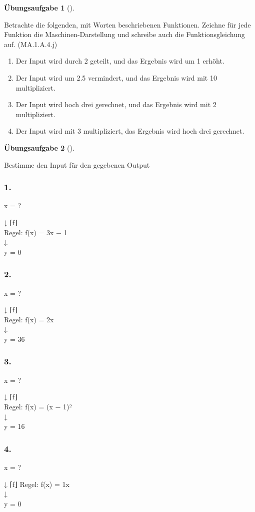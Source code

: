 \documentclass[
  10pt,
  a4paper,
  DIV=11]{scrartcl}
\providecommand{\tightlist}{%
  \setlength{\itemsep}{0pt}\setlength{\parskip}{0pt}}\usepackage{longtable,booktabs,array}
\theoremstyle{definition}
\newtheorem{exercise}{Übungsaufgabe}[section]
\theoremstyle{remark}
\begin{document}
\begin{exercise}[]\protect\hypertarget{exr-line}{}\label{exr-line}

Betrachte die folgenden, mit Worten beschriebenen Funktionen. Zeichne
für jede Funktion die Maschinen-Darstellung und schreibe auch die
Funktionsgleichung auf. (MA.1.A.4.j)

\begin{enumerate}
\def\labelenumi{\arabic{enumi}.}
\tightlist
\item
  Der Input wird durch 2 geteilt, und das Ergebnis wird um 1 erhöht.
\item
  Der Input wird um 2.5 vermindert, und das Ergebnis wird mit 10
  multipliziert.
\item
  Der Input wird hoch drei gerechnet, und das Ergebnis wird mit 2
  multipliziert.
\item
  Der Input wird mit 3 multipliziert, das Ergebnis wird hoch drei
  gerechnet.
\end{enumerate}

\end{exercise}

\begin{exercise}[]\protect\hypertarget{exr-line}{}\label{exr-line}

Bestimme den Input für den gegebenen Output

\subsubsection{1.}\label{section}

x = ?

↓ ⌈ƒ⌋\\
Regel: f(x) = 3x − 1\\
↓\\
y = 0

\subsubsection{2.}\label{section-1}

x = ?

↓ ⌈ƒ⌋\\
Regel: f(x) = 2x\\
↓\\
y = 36

\subsubsection{3.}\label{section-2}

x = ?

↓ ⌈ƒ⌋\\
Regel: f(x) = (x − 1)²\\
↓\\
y = 16

\subsubsection{4.}\label{section-3}

x = ?

↓ ⌈ƒ⌋ Regel: f(x) = 1x\\
↓\\
y = 0

\end{exercise}
\end{document}
